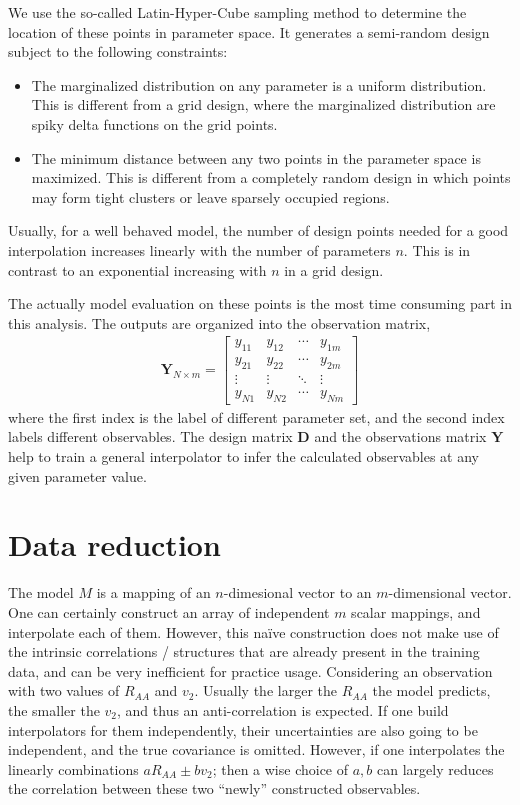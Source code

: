 We use the so-called Latin-Hyper-Cube sampling method to determine the location of these points in parameter space. 
It generates a semi-random design subject to the following constraints:
\begin{itemize}
\item The marginalized distribution on any parameter is a uniform distribution.
This is different from a grid design, where the marginalized distribution are spiky delta functions on the grid points.
\item The minimum distance between any two points in the parameter space is maximized.
This is different from a completely random design in which points may form tight clusters or leave sparsely occupied regions.
\end{itemize}
Usually, for a well behaved model, the number of design points needed for a good interpolation increases linearly with the number of parameters $n$. 
This is in contrast to an exponential increasing with $n$ in a grid design.

The actually model evaluation on these points is the most time consuming part in this analysis.
The outputs are organized into the observation matrix,
\begin{eqnarray}
\mathbf{Y}_{N\times m} = 
\begin{bmatrix}
y_{11} & y_{12} & \cdots & y_{1m}\\
y_{21} & y_{22} & \cdots & y_{2m}\\
\vdots & \vdots & \ddots & \vdots \\
y_{N1} & y_{N2} & \cdots & y_{Nm}
\end{bmatrix}
\end{eqnarray}
where the first index is the label of different parameter set, and the second index labels different observables.
The design matrix $\mathbf{D}$ and the observations matrix $\mathbf{Y}$ help to train a general interpolator to infer the calculated observables at any given parameter value.

\section{Data reduction}
The model $M$ is a mapping of an $n$-dimesional vector to an $m$-dimensional vector. 
One can certainly construct an array of independent $m$ scalar mappings, and interpolate each of them.
However, this na\"ive construction does not make use of the intrinsic correlations / structures that are already present in the training data, and can be very inefficient for practice usage.
Considering an observation with two values of $R_{AA}$ and $v_2$. Usually the larger the $R_{AA}$ the model predicts, the smaller the $v_2$, and thus an anti-correlation is expected.
If one build interpolators for them independently, their uncertainties are also going to be independent, and the true covariance is omitted.
However, if one interpolates the linearly combinations $a R_{AA} \pm b v_2$; then a wise choice of $a, b$ can largely reduces the correlation between these two ``newly'' constructed observables.

